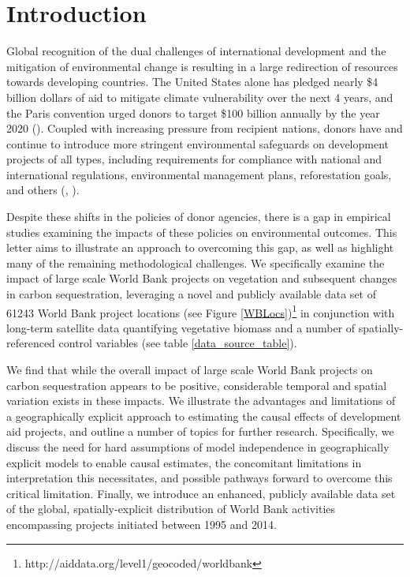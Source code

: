 \documentclass{article}\usepackage[]{graphicx}\usepackage[]{color}
\newenvironment{knitrout}{}{}  %
\begin{document}
\begin{knitrout}
\newpage
\section{Introduction}

Global recognition of the dual challenges of international development and the mitigation of environmental change is resulting in a large redirection of resources towards developing countries. 
The United States alone has pledged nearly \$4 billion dollars of aid to mitigate climate vulnerability over the next 4 years, and the Paris convention urged donors to target \$100 billion annually by the year 2020 (\cite{royal_united_2015}). 
Coupled with increasing pressure from recipient nations, donors have and continue to introduce more stringent environmental safeguards on development projects of all types, including requirements for compliance with national and international regulations, environmental management plans, reforestation goals, and others (\cite{nielson_delegation_2003}, \cite{gutner_explaining_2005}).



\par

Despite these shifts in the policies of donor agencies, there is a gap in empirical studies examining the impacts of these policies on environmental outcomes.  
This letter aims to illustrate an approach to overcoming this gap, as well as highlight many of the remaining methodological challenges.
We specifically examine the impact of large scale World Bank projects on vegetation and subsequent changes in carbon sequestration, leveraging a novel and publicly available data set of 61243 World Bank project locations (see Figure \ref{WBLocs})\footnote{http://aiddata.org/level1/geocoded/worldbank} in conjunction with long-term satellite data quantifying vegetative biomass and a number of spatially-referenced control variables (see table \ref{data_source_table}).


\par

We find that while the overall impact of large scale World Bank projects on carbon sequestration appears to be positive, considerable temporal and spatial variation exists in these impacts.
We illustrate the advantages and limitations of a geographically explicit approach to estimating the causal effects of development aid projects, and outline a number of topics for further research.
Specifically, we discuss the need for hard assumptions of model independence in geographically explicit models to enable causal estimates, the concomitant limitations in interpretation this necessitates, and possible pathways forward to overcome this critical limitation.
Finally, we introduce an enhanced, publicly available data set of the global, spatially-explicit distribution of World Bank activities encompassing projects initiated between 1995 and 2014.

\end{knitrout}
\end{document}
